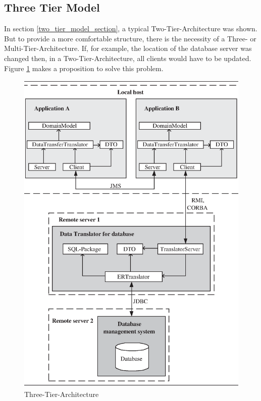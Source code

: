 \subsection{Three Tier Model}
\label{three_tier_model_section}

In section \ref{two_tier_model_section}, a typical Two-Tier-Architecture was shown.
But to provide a more comfortable structure, there is the necessity of a Three-
or Multi-Tier-Architecture. If, for example, the location of the database server
was changed then, in a Two-Tier-Architecture, all clients would have to be updated.
Figure \ref{three_tier_architecture_figure} makes a proposition to solve this problem.

\begin{figure}[ht]
    \begin{center}
       \includegraphics[scale=0.45]{images/three_tier_architecture.eps}
       \caption{Three-Tier-Architecture}
       \label{three_tier_architecture_figure}
    \end{center}
\end{figure}
